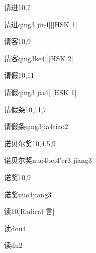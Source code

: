 \begin{entry}{请进}{10,7}
  \begin{phonetics}{请进}{qing3 jin4}[][HSK 1]
  \end{phonetics}
\end{entry}

\begin{entry}{请客}{10,9}
  \begin{phonetics}{请客}{qing3ke4}[][HSK 2]
  \end{phonetics}
\end{entry}

\begin{entry}{请假}{10,11}
  \begin{phonetics}{请假}{qing3 jia4}[][HSK 1]
  \end{phonetics}
\end{entry}

\begin{entry}{请假条}{10,11,7}
  \begin{phonetics}{请假条}{qing3jia4tiao2}
  \end{phonetics}
\end{entry}

\begin{entry}{诺贝尔奖}{10,4,5,9}
  \begin{phonetics}{诺贝尔奖}{nuo4bei4'er3 jiang3}
  \end{phonetics}
\end{entry}

\begin{entry}{诺奖}{10,9}
  \begin{phonetics}{诺奖}{nuo4jiang3}
  \end{phonetics}
\end{entry}

\begin{entry}{读}{10}[Radical 言]
  \begin{phonetics}{读}{dou4}
  \end{phonetics}
  \begin{phonetics}{读}{du2}
  \end{phonetics}
\end{entry}

